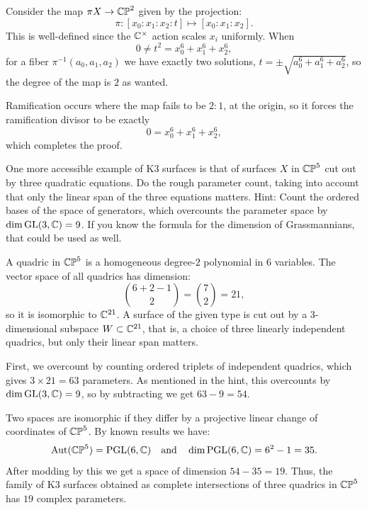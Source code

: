 \documentclass[11pt, a4paper]{article}
\begin{document}
\begin{solution}
  Consider the map $\pi X \to \mathbb{CP}^2$ given by the projection:
  \[
    \pi \colon [x_0 : x_1 : x_2 : t] \mapsto [x_0 : x_1 : x_2].
  \]
  This is well-defined since the $\mathbb{C}^{\times}$ action scales $x_i$ 
  uniformly. 
  When 
  \[
    0 \neq t^2 = x_0^6 + x_1^6 + x_2^6,
  \]
  for a fiber $\pi^{-1}(a_0,a_1,a_2)$ we have exactly two solutions,
  $t = \pm \sqrt{a_0^6 + a_1^6 + a_2^6}$,
  so the degree of the map is $2$ as wanted.

  Ramification occurs where the map fails to be $2 : 1$,
  at the origin, so it forces the ramification divisor to be exactly
  \[
    0 = x_0^6 + x_1^6 + x_2^6,
  \]
  which completes the proof.
\end{solution}

\begin{exercise}
  One more accessible example of $\mathrm K3$ surfaces is that of surfaces $X$
  in $\mathbb{CP}^5$ cut out by three quadratic equations.
  Do the rough parameter count, taking into account that only the linear span
  of the three equations matters.
  Hint: Count the ordered bases of the space of generators,
  which overcounts the parameter space by $\dim \mathrm{GL}(3,\mathbb{C}) = 9$.
  If you know the formula for the dimension of Grassmannians,
  that could be used as well.
\end{exercise}
\begin{solution}
  A quadric in $\mathbb{CP}^5$ is a homogeneous degree-$2$ polynomial in $6$ variables. 
  The vector space of all quadrics has dimension:
  \[
    \binom{6 + 2 - 1}{2} =
    \binom{7}{2} = 21,
  \]
  so it is isomorphic to $\mathbb{C}^{21}$.
  A surface of the given type is cut out by a $3$-dimensional subspace
  $W \subset \mathbb{C}^{21}$, that is, a choice of three linearly independent 
  quadrics, but only their linear span matters.
  
  First, we overcount by counting ordered triplets of independent quadrics,
  which gives $3 \times 21 = 63$ parameters.
  As mentioned in the hint, this overcounts by $\dim \mathrm{GL}(3,\mathbb{C}) = 9$,
  so by subtracting we get $63 - 9 = 54$. 

  Two spaces are isomorphic if they differ by a projective linear change
  of coordinates of $\mathbb{CP}^5$. 
  By known results we have:
  \[
    \operatorname{Aut}(\mathbb{CP}^5) = \mathrm{PGL}(6,\mathbb{C}) \quad \text{and} \quad 
    \dim \mathrm{PGL}(6,\mathbb{C}) = 6^2 - 1 = 35.
  \]
  After modding by this we get a space of dimension $54 - 35 = 19$. 
  Thus, the family of $\mathrm K3$ surfaces obtained as complete intersections 
  of three quadrics in $\mathbb{CP}^5$ has $19$ complex parameters.
\end{solution}
\end{document}
